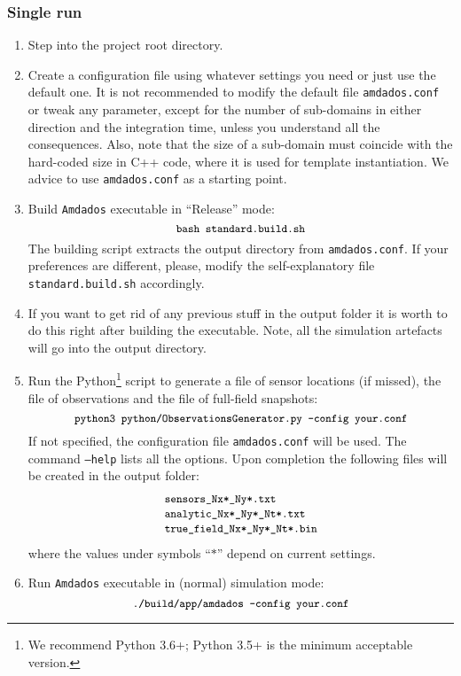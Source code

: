 \documentclass[]{article}
\begin{document}
\subsubsection{Single run}
\begin{enumerate}
\item Step into the project root directory.
\item Create a configuration file using whatever settings you need or just use the default one. It is not recommended to modify the default file \texttt{amdados.conf} or tweak any parameter, except for the number of sub-domains in either direction and the integration time, unless you understand all the consequences. Also, note that the size of a sub-domain must coincide with the hard-coded size in C++ code, where it is used for template instantiation. We advice to use \texttt{amdados.conf} as a starting point.
\item Build \texttt{Amdados} executable in ``Release'' mode:
$$
\mbox{\small\texttt{bash standard.build.sh}}
$$
The building script extracts the output directory from \texttt{amdados.conf}. If your preferences are different, please, modify the self-explanatory file \texttt{standard.build.sh} accordingly.
\item If you want to get rid of any previous stuff in the output folder it is worth to do this right after building the executable. Note, all the simulation artefacts will go into the output directory. 
\item Run the Python\footnote{We recommend Python 3.6+; Python 3.5+ is the minimum acceptable version.} script to generate a file of sensor locations (if missed), the file of observations and the file of full-field snapshots:
$$
\mbox{\small\texttt{python3 python/ObservationsGenerator.py --config your.conf}}
$$
If not specified, the configuration file \texttt{amdados.conf} will be used. The command \texttt{--help} lists all the options. Upon completion the following files will be created in the output folder:
$$
\begin{array}{l}
\mbox{\small\texttt{sensors\_Nx*\_Ny*.txt}} \\
\mbox{\small\texttt{analytic\_Nx*\_Ny*\_Nt*.txt}} \\
\mbox{\small\texttt{true\_field\_Nx*\_Ny*\_Nt*.bin}}
\end{array}
$$
where the values under symbols ``$*$'' depend on current settings.
\item Run \texttt{Amdados} executable in (normal) simulation mode:
$$
\mbox{\small\texttt{./build/app/amdados --config your.conf}}
$$
\end{enumerate}
\end{document}
